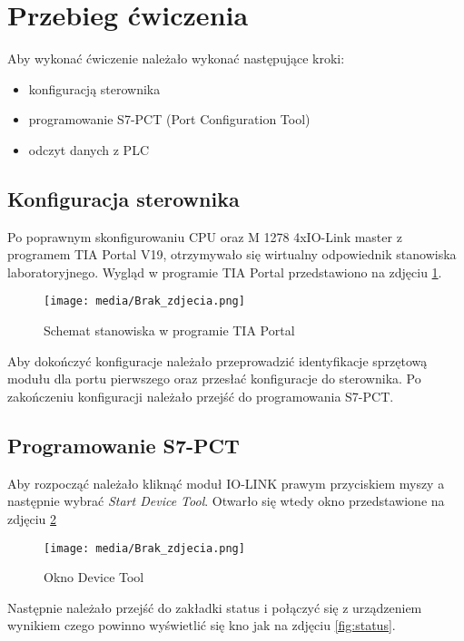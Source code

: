 \documentclass{article}
\begin{document}
\newpage
\section{Przebieg ćwiczenia}
Aby wykonać ćwiczenie należało wykonać następujące kroki:
\begin{itemize}
    \item konfiguracją sterownika
    \item programowanie S7-PCT (Port Configuration Tool)
    \item odczyt danych z PLC
\end{itemize}

\subsection{Konfiguracja sterownika}
Po poprawnym skonfigurowaniu CPU oraz M 1278 4xIO-Link master z programem TIA Portal V19, otrzymywało się wirtualny odpowiednik stanowiska laboratoryjnego. Wygląd w programie TIA Portal przedstawiono na zdjęciu \ref{fig:konfiguracja}.

\begin{figure}[H]
    \centering
    \texttt{[image: media/Brak\_zdjecia.png]}
    \caption{Schemat stanowiska w programie TIA Portal}
    \label{fig:konfiguracja}
\end{figure}

Aby dokończyć konfiguracje należało przeprowadzić identyfikacje sprzętową modułu dla portu pierwszego oraz przesłać konfiguracje do sterownika. Po zakończeniu konfiguracji należało przejść do programowania S7-PCT.

\newpage
\subsection{Programowanie S7-PCT}
Aby rozpocząć należało kliknąć moduł IO-LINK prawym przyciskiem myszy a następnie wybrać \textit{Start Device Tool}. Otwarło się wtedy okno przedstawione na zdjęciu \ref{fig:Dev_tool}

\begin{figure}[H]
    \centering
    \texttt{[image: media/Brak\_zdjecia.png]}
    \caption{Okno Device Tool}
    \label{fig:Dev_tool}
\end{figure}

Następnie należało przejść do zakładki status i połączyć się z urządzeniem wynikiem czego powinno wyświetlić się kno jak na zdjęciu \ref{fig:status}.
\end{document}
